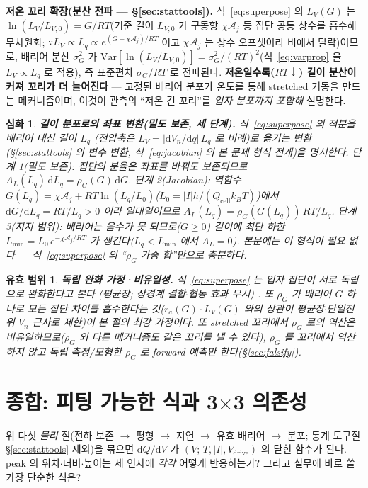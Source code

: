 \documentclass[11pt,a4paper]{article}
\newtheorem*{boundbox}{유효 범위}
\newtheorem*{rigorbox}{심화}
\newcommand{\dd}{\mathrm{d}}
\newcommand{\drive}{\mathrm{drive}}
\newcommand{\cell}{\mathrm{cell}}
\begin{document}
\textbf{저온 꼬리 확장(분산 전파 — \S\ref{sec:stattools}).} 식~\eqref{eq:superpose} 의 $L_V(G)$ 는 $\ln(L_V/L_{V,0})=G/RT$(기준 길이 $L_{V,0}$ 가 구동항 $\chi\mathcal A_j$ 등 집단 공통 상수를 흡수해 무차원화;
$\because L_V\propto L_q\propto e^{(G-\chi\mathcal A_j)/RT}$ 이고 $\chi\mathcal A_j$ 는 상수 오프셋이라 비에서 탈락)이므로, 배리어 분산 $\sigma_G^2$ 가 $\mathrm{Var}[\ln(L_V/L_{V,0})]=\sigma_G^2/(RT)^2$(식~\eqref{eq:varprop} 을 $L_V\propto L_q$ 로 적용), 즉
표준편차 $\sigma_G/RT$ 로 전파된다. \textbf{저온일수록($RT\downarrow$) 길이 분산이 커져 꼬리가 더 늘어진다} — 고정된
배리어 분포가 온도를 통해 stretched 거동을 만드는 메커니즘이며, 이것이 관측의 ``저온 긴 꼬리''를 \emph{입자
분포까지 포함해} 설명한다.

\begin{rigorbox}
\textbf{길이 분포로의 좌표 변환(밀도 보존, 세 단계).} 식~\eqref{eq:superpose} 의 적분을 배리어 대신 길이 $L_q$
(전압축은 $L_V=|\dd V_n/\dd q|\,L_q$ 로 비례)로 옮기는 변환(\S\ref{sec:stattools} 의 변수 변환, 식~\eqref{eq:jacobian} 의 본 문제 형식 전개)을 명시한다. \emph{단계 1(밀도 보존)}: 집단의 분율은 좌표를 바꿔도 보존되므로 $A_L(L_q)\,\dd L_q=\rho_G(G)\,\dd G$.
\emph{단계 2(Jacobian)}: 역함수 $G(L_q)=\chi\mathcal A_j+RT\ln(L_q/L_0)$($L_0=|I|h/(Q_\cell k_BT)$)에서
$\dd G/\dd L_q=RT/L_q>0$ 이라 일대일이므로 $A_L(L_q)=\rho_G(G(L_q))\,RT/L_q$. \emph{단계 3(지지 범위)}: 배리어는
음수가 못 되므로($G\ge0$) 길이에 최단 하한 $L_{\min}=L_0\,e^{-\chi\mathcal A_j/RT}$ 가 생긴다($L_q<L_{\min}$ 에서
$A_L=0$). 본문에는 이 형식이 필요 없다 — 식~\eqref{eq:superpose} 의 ``$\rho_G$ 가중 합''만으로 충분하다.
\end{rigorbox}
\begin{boundbox}
\textbf{독립 완화 가정·비유일성.} 식~\eqref{eq:superpose} 는 입자 집단이 \emph{서로 독립}으로 완화한다고 본다
(평균장; 상경계 결합$\cdot$협동 효과 무시) \cite{funabiki1999}. 또 $\rho_G$ 가 배리어 $G$ \emph{하나}로 모든 집단
차이를 흡수한다는 것($r_a(G)\cdot L_V(G)$ 와의 상관이 평균장$\cdot$단일전위 $V_n$ 근사로 제한)이 본 절의 최강 가정이다.
또 stretched 꼬리에서 $\rho_G$ 로의 역산은
\emph{비유일}하므로($\rho_G$ 외 다른 메커니즘도 같은 꼬리를 낼 수 있다), $\rho_G$ 를 꼬리에서 역산하지 않고
독립 측정/모형한 $\rho_G$ 로 \emph{forward 예측}만 한다(\S\ref{sec:falsify}).
\end{boundbox}

\section{종합: 피팅 가능한 식과 3$\times$3 의존성}\label{sec:synth}
위 다섯 \emph{물리} 절(전하 보존 $\to$ 평형 $\to$ 지연 $\to$ 유효 배리어 $\to$ 분포; 통계 도구절
\S\ref{sec:stattools} 제외)을 묶으면 $\dd Q/\dd V$ 가 $(V;\,T,|I|,V_\drive)$ 의 닫힌 함수가 된다. peak 의
위치$\cdot$너비$\cdot$높이는 세 인자에 \emph{각각} 어떻게 반응하는가? 그리고 실무에 바로 쓸 가장 단순한 식은?
\end{document}
